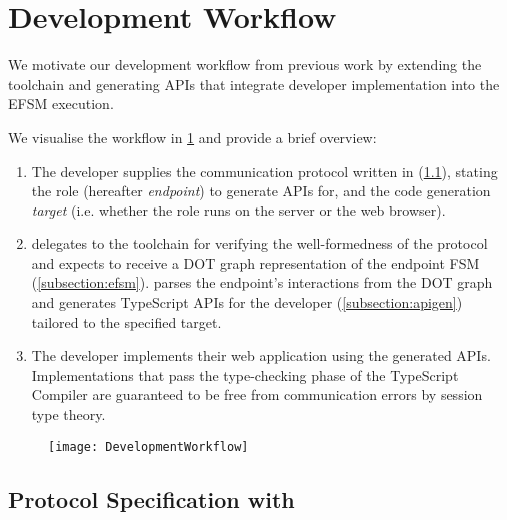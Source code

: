 \section{Development Workflow}


We motivate our development workflow from previous work 
\cite{PureScript2019} by extending the  toolchain
and generating APIs that integrate developer implementation
into the EFSM execution.

We visualise the workflow in \cref{fig:devworkflow} 
and provide a brief overview:

\begin{enumerate}

\item The developer supplies the communication protocol written in
 (\cref{subsection:scribble}), 
stating the role (hereafter \textit{endpoint})
to generate APIs for,
and the code generation \textit{target} 
(i.e. whether the role runs on the server or the web browser).

\item {} delegates to the 
 toolchain for verifying the well-formedness of
the protocol and expects to receive a DOT graph representation of
the endpoint FSM (\cref{subsection:efsm}). 
 parses the endpoint's 
interactions from the DOT graph and generates TypeScript APIs
for the developer (\cref{subsection:apigen}) 
tailored to the specified target.

\item The developer implements their web application using the
generated APIs. Implementations that pass the type-checking phase
of the TypeScript Compiler are guaranteed to be free from 
communication errors by session type theory.

\end{enumerate}

\begin{figure}[!ht]
\centering
\texttt{[image: DevelopmentWorkflow]}
\label{fig:devworkflow}
\end{figure}

\subsection{Protocol Specification with }
\label{subsection:scribble}

